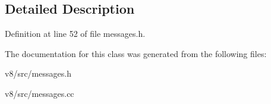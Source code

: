 \subsection{Detailed Description}


Definition at line 52 of file messages.\+h.



The documentation for this class was generated from the following files\+:\begin{DoxyCompactItemize}
\item 
v8/src/messages.\+h\item 
v8/src/messages.\+cc\end{DoxyCompactItemize}
